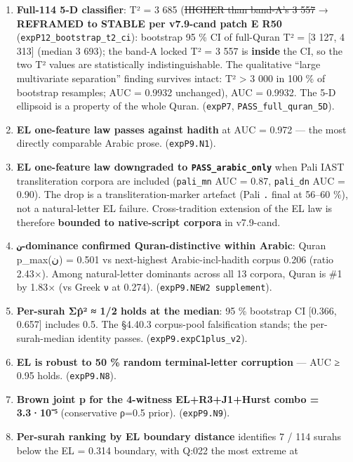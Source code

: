 \documentclass[
]{article}
\providecommand{\tightlist}{%
  \setlength{\itemsep}{0pt}\setlength{\parskip}{0pt}}
\begin{document}
\begin{enumerate}
\def\labelenumi{\arabic{enumi}.}
\tightlist
\item
  \textbf{Full-114 5-D classifier}: T² = 3 685 (\st{HIGHER than band-A's
  3 557} → \textbf{REFRAMED to STABLE per v7.9-cand patch E R50}
  (\texttt{expP12\_bootstrap\_t2\_ci}): bootstrap 95 \% CI of full-Quran
  T² = {[}3 127, 4 313{]} (median 3 693); the band-A locked T² = 3 557
  is \textbf{inside} the CI, so the two T² values are statistically
  indistinguishable. The qualitative ``large multivariate separation''
  finding survives intact: T² \textgreater{} 3 000 in 100 \% of
  bootstrap resamples; AUC = 0.9932 unchanged), AUC = 0.9932. The 5-D
  ellipsoid is a property of the whole Quran. (\texttt{expP7},
  \texttt{PASS\_full\_quran\_5D}).
\item
  \textbf{EL one-feature law passes against hadith} at AUC = 0.972 ---
  the most directly comparable Arabic prose. (\texttt{expP9.N1}).
\item
  \textbf{EL one-feature law downgraded to \texttt{PASS\_arabic\_only}}
  when Pali IAST transliteration corpora are included (\texttt{pali\_mn}
  AUC = 0.87, \texttt{pali\_dn} AUC = 0.90). The drop is a
  transliteration-marker artefact (Pali \texttt{.} final at 56--60 \%),
  not a natural-letter EL failure. Cross-tradition extension of the EL
  law is therefore \textbf{bounded to native-script corpora} in
  v7.9-cand.
\item
  \textbf{\texttt{ن}-dominance confirmed Quran-distinctive within
  Arabic}: Quran p\_max(ن) = 0.501 vs next-highest Arabic-incl-hadith
  corpus 0.206 (ratio 2.43×). Among natural-letter dominants across all
  13 corpora, Quran is \#1 by 1.83× (vs Greek \texttt{ν} at 0.274).
  (\texttt{expP9.NEW2\ supplement}).
\item
  \textbf{Per-surah Σp̂² ≈ 1/2 holds at the median}: 95 \% bootstrap CI
  {[}0.366, 0.657{]} includes 0.5. The §4.40.3 corpus-pool falsification
  stands; the per-surah-median identity passes.
  (\texttt{expP9.expC1plus\_v2}).
\item
  \textbf{EL is robust to 50 \% random terminal-letter corruption} ---
  AUC ≥ 0.95 holds. (\texttt{expP9.N8}).
\item
  \textbf{Brown joint p for the 4-witness EL+R3+J1+Hurst combo =
  3.3·10⁻⁵} (conservative ρ=0.5 prior). (\texttt{expP9.N9}).
\item
  \textbf{Per-surah ranking by EL boundary distance} identifies 7 / 114
  surahs below the EL = 0.314 boundary, with Q:022 the most extreme at

\end{enumerate}
\end{document}
